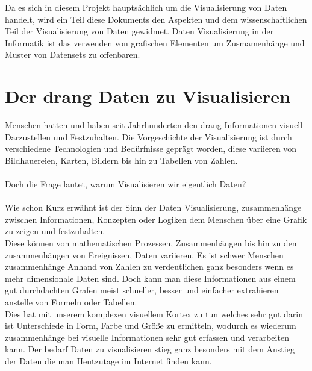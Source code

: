 
Da es sich in diesem Projekt hauptsächlich um die Visualisierung von Daten handelt, wird ein Teil diese Dokuments den Aspekten und dem
wissenschaftlichen Teil der Visualisierung von Daten gewidmet. Daten Visualisierung in der Informatik ist das verwenden von grafischen
Elementen um Zusmamenhänge und Muster von Datensets zu offenbaren.  

\section{Der drang Daten zu Visualisieren}
Menschen hatten und haben seit Jahrhunderten den drang Informationen visuell Darzustellen und Festzuhalten. Die Vorgeschichte der Visualisierung
ist durch verschiedene Technologien und Bedürfnisse geprägt worden, diese variieren von Bildhauereien, Karten, Bildern bis hin zu Tabellen
von Zahlen.\\ \\
Doch die Frage lautet, warum Visualisieren wir eigentlich Daten? \\ \\
Wie schon Kurz erwähnt ist der Sinn der Daten Visualisierung, zusammenhänge zwischen Informationen, Konzepten oder Logiken dem Menschen über
eine Grafik zu zeigen und festzuhalten.  \\
Diese können von mathematischen Prozessen, Zusammenhängen bis hin zu den zusammenhängen von Ereignissen, Daten variieren. Es ist schwer
Menschen zusammenhänge Anhand von Zahlen zu verdeutlichen ganz besonders wenn es mehr dimensionale Daten sind. Doch kann man diese
Informationen aus einem gut durchdachten Grafen meist schneller, besser und einfacher extrahieren anstelle von Formeln oder Tabellen. \\ 
Dies hat mit unserem komplexen visuellem Kortex zu tun welches sehr gut darin ist Unterschiede in Form, Farbe und Größe zu ermitteln, wodurch
es wiederum zusammenhänge bei visuelle Informationen sehr gut erfassen und verarbeiten kann. Der bedarf Daten zu visualisieren stieg ganz
besonders mit dem Anstieg der Daten die man Heutzutage im Internet finden kann. \newpage

